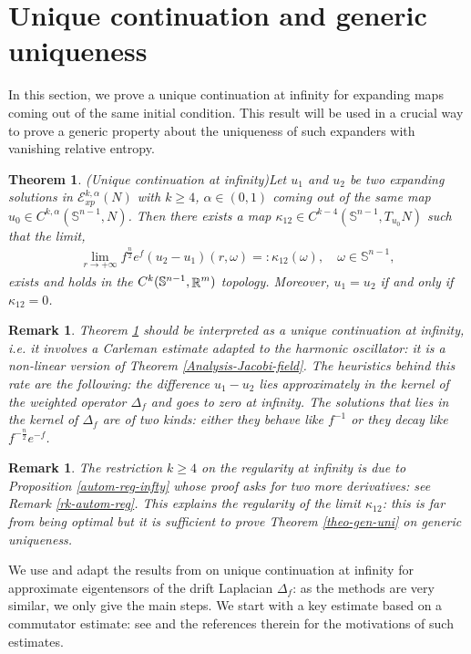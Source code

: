 \documentclass[a4paper,11pt,reqno]{amsart}
\newtheorem{theo}[defn]{Theorem}
\newtheorem{rk}[defn]{Remark}
\def\R{\mathop{\rm \mathbb{R}}\nolimits}
\newcommand{\Sp}{\mathbb{S}}
\newcommand{\Ent}{\mathcal{E}}
\begin{document}
\section{Unique continuation and generic uniqueness}\label{uni-cont-gen-uni}

In this section, we prove a unique continuation at infinity for expanding maps coming out of the same initial condition. This result will be used in a crucial way to prove a generic property about the uniqueness of such expanders with vanishing relative entropy.


\begin{theo}(Unique continuation at infinity)\label{uni-cont-inf}
Let $u_1$ and $u_2$ be two expanding solutions in $\Ent_{xp}^{k,\alpha}(N)$ with $k\geq 4$, $\alpha\in(0,1)$ coming out of the same map $u_0\in C^{k,\alpha}(\mathbb{S}^{n-1},N)$. Then there exists a map $\kappa_{12}\in C^{k-4}(\mathbb{S}^{n-1},T_{u_0}N)$ such that the limit,
\begin{eqnarray}
\lim_{r\rightarrow+\infty}f^{\frac{n}{2}}e^f(u_2-u_1)(r,\omega)=:\kappa_{12}(\omega),\quad \omega\in\mathbb{S}^{n-1},
\end{eqnarray}
exists and holds in the $C^{k}(\Sp^{n-1},\R^m)$ topology. Moreover, $u_1=u_2$ if and only if $\kappa_{12}=0$.
\end{theo}

\begin{rk}
Theorem \ref{uni-cont-inf} should be interpreted as a unique continuation at infinity, i.e. it involves a Carleman estimate adapted to the harmonic oscillator: it is a non-linear version of Theorem \ref{Analysis-Jacobi-field}. The heuristics behind this rate are the following: the difference $u_1-u_2$ lies approximately in the kernel of the weighted operator $\Delta_f$ and goes to zero at infinity. The solutions that lies in the kernel of $\Delta_f$ are of two kinds: either they behave like $f^{-1}$ or they decay like $f^{-\frac{n}{2}}e^{-f}$. 
\end{rk}

\begin{rk}
The restriction $k\geq 4$ on the regularity at infinity is due to Proposition \ref{autom-reg-infty} whose proof asks for two more derivatives: see Remark \ref{rk-autom-reg}. This explains the regularity of the limit $\kappa_{12}$: this is far from being optimal but it is sufficient to prove Theorem \ref{theo-gen-uni} on generic uniqueness.
\end{rk}
We use and adapt the results from \cite{Uni-Con-Egs-Der} on unique continuation at infinity for approximate eigentensors of the drift Laplacian $\Delta_f$: as the methods are very similar, we only give the main steps. We start with a key estimate based on a commutator estimate: see \cite{Uni-Con-Egs-Der} and the references therein for the motivations of such estimates.
\end{document}
